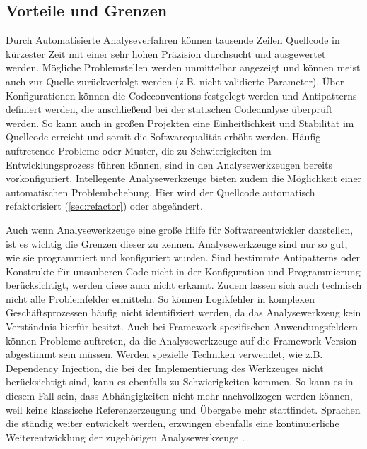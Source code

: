 \subsection{Vorteile und Grenzen}
\label{subsec:Codeanalyse_risks}
Durch Automatisierte Analyseverfahren können tausende Zeilen Quellcode in kürzester Zeit mit einer sehr hohen Präzision durchsucht und ausgewertet werden. Mögliche Problemstellen werden unmittelbar angezeigt und können meist auch zur Quelle zurückverfolgt werden (z.B. nicht validierte Parameter). Über Konfigurationen können die Codeconventions festgelegt werden und Antipatterns definiert werden, die anschließend bei der statischen Codeanalyse überprüft werden. So kann auch in großen Projekten eine Einheitlichkeit und Stabilität im Quellcode erreicht und somit die Softwarequalität erhöht werden.
Häufig auftretende Probleme oder Muster, die zu Schwierigkeiten im Entwicklungsprozess führen können, sind in den Analysewerkzeugen bereits vorkonfiguriert.
Intellegente Analysewerkzeuge bieten zudem die Möglichkeit einer automatischen Problembehebung. Hier wird der Quellcode automatisch refaktorisiert (\autoref{sec:refactor}) oder abgeändert.

Auch wenn Analysewerkzeuge eine große Hilfe für Softwareentwickler darstellen, ist es wichtig die Grenzen dieser zu kennen. Analysewerkzeuge sind nur so gut, wie sie programmiert und konfiguriert wurden. Sind bestimmte Antipatterns oder Konstrukte für unsauberen Code nicht in der Konfiguration und Programmierung berücksichtigt, werden diese auch nicht erkannt. Zudem lassen sich auch technisch nicht alle Problemfelder ermitteln. So können Logikfehler in komplexen Geschäftsprozessen häufig nicht identifiziert werden, da das Analysewerkzeug kein Verständnis hierfür besitzt. Auch bei Framework-spezifischen Anwendungsfeldern können Probleme auftreten, da die Analysewerkzeuge auf die Framework Version abgestimmt sein müssen. Werden spezielle Techniken verwendet, wie z.B. Dependency Injection, die bei der Implementierung des Werkzeuges nicht berücksichtigt sind, kann es ebenfalls zu Schwierigkeiten kommen. So kann es in diesem Fall sein, dass Abhängigkeiten nicht mehr nachvollzogen werden können, weil keine klassische Referenzerzeugung und Übergabe mehr stattfindet. Sprachen die ständig weiter entwickelt werden, erzwingen ebenfalls eine kontinuierliche Weiterentwicklung der zugehörigen Analysewerkzeuge \cite{OwaspCodeReview2008}\cite{wiki:Statische_Code-Analyse}\cite{embedded_swe_codeanalysis}. 

